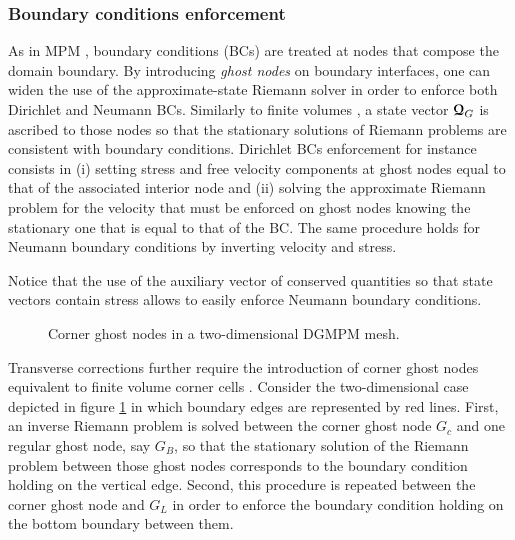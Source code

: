 \subsubsection*{Boundary conditions enforcement}
As in MPM \cite{Love,BC_MPM}, boundary conditions (BCs) are treated at nodes that compose the domain boundary. By introducing \textit{ghost nodes} on boundary interfaces, one can widen the use of the approximate-state Riemann solver in order to enforce both Dirichlet and Neumann BCs. Similarly to finite volumes \cite{Leveque}, a state vector ${\boldsymbol{\mathcal{Q}}}_G$ is ascribed to those nodes so that the stationary solutions of Riemann problems are consistent with boundary conditions. Dirichlet BCs enforcement for instance consists in (i) setting stress and free velocity components at ghost nodes equal to that of the associated interior node and (ii) solving the approximate Riemann problem for the velocity that must be enforced on ghost nodes knowing the stationary one that is equal to that of the BC. The same procedure holds for Neumann boundary conditions by inverting velocity and stress.

Notice that the use of the auxiliary vector of conserved quantities so that state vectors contain stress %
allows to easily enforce Neumann boundary conditions. %
\begin{figure}[ht]
  \centering
  
  \caption{Corner ghost nodes in a two-dimensional DGMPM mesh.}
  \label{fig:corner_ghost}
\end{figure}
Transverse corrections further require the introduction of corner ghost nodes equivalent to finite volume corner cells \cite{Leveque}. Consider the two-dimensional case depicted in figure \ref{fig:corner_ghost} in which boundary edges are represented by red lines.
First, an inverse Riemann problem is solved between the corner ghost node $G_c$ and one regular ghost node, say $G_B$, so that the stationary solution of the Riemann problem between those ghost nodes corresponds to the boundary condition holding on the vertical edge.
Second, this procedure is repeated between the corner ghost node and $G_L$ in order to enforce the boundary condition holding on the bottom boundary between them.

